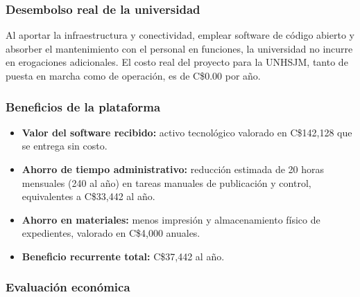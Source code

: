 \subsubsection{Desembolso real de la universidad}

Al aportar la infraestructura y conectividad, emplear software de código abierto y absorber el mantenimiento con el personal en funciones, la universidad no incurre en erogaciones adicionales. El costo real del proyecto para la UNHSJM, tanto de puesta en marcha como de operación, es de C\$0.00 por año.

\subsubsection{Beneficios de la plataforma}

\begin{itemize}
	\item \textbf{Valor del software recibido:} activo tecnológico valorado en C\$142,128 que se entrega sin costo.
	\item \textbf{Ahorro de tiempo administrativo:} reducción estimada de 20 horas mensuales (240 al año) en tareas manuales de publicación y control, equivalentes a C\$33,442 al año.
	\item \textbf{Ahorro en materiales:} menos impresión y almacenamiento físico de expedientes, valorado en C\$4,000 anuales.
	\item \textbf{Beneficio recurrente total:} C\$37,442 al año.
\end{itemize}

\subsubsection{Evaluación económica}

